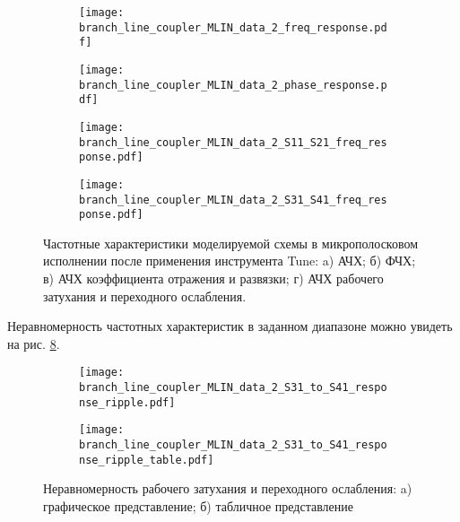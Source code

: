 \begin{figure}[!ht]
    \centering
    \begin{subfigure}[b]{0.45\textwidth}
        \centering
        \texttt{[image: branch\_line\_coupler\_MLIN\_data\_2\_freq\_response.pdf]}
        \caption{}
        \label{fig:branch_line_coupler_MLIN_data_2_freq_response}
    \end{subfigure}
    \hfill
    \begin{subfigure}[b]{0.45\textwidth}
        \centering
        \texttt{[image: branch\_line\_coupler\_MLIN\_data\_2\_phase\_response.pdf]}
        \caption{}
        \label{fig:branch_line_coupler_MLIN_data_2_phase_response}
    \end{subfigure}
    \vfill
    \begin{subfigure}[b]{0.45\textwidth}
        \centering
        \texttt{[image: branch\_line\_coupler\_MLIN\_data\_2\_S11\_S21\_freq\_response.pdf]}
        \caption{}
        \label{fig:branch_line_coupler_MLIN_data_2_S11_S21_freq_response}
    \end{subfigure}
    \hfill
    \begin{subfigure}[b]{0.45\textwidth}
        \centering
        \texttt{[image: branch\_line\_coupler\_MLIN\_data\_2\_S31\_S41\_freq\_response.pdf]}
        \caption{}
        \label{fig:branch_line_coupler_MLIN_data_2_S31_S41_freq_response}
    \end{subfigure}
    \caption{
        Частотные характеристики моделируемой схемы в микрополосковом исполнении после применения инструмента Tune:
        a) АЧХ;
        б) ФЧХ;
        в) АЧХ коэффициента отражения и развязки;
        г) АЧХ рабочего затухания и переходного ослабления.
    }
    \label{fig:branch_line_coupler_MLIN_data_2}
\end{figure}

Неравномерность частотных характеристик в заданном диапазоне можно увидеть на рис. \ref{fig:branch_line_coupler_MLIN_data_2_response_ripple}.

\begin{figure}[!ht]
    \centering
    \begin{subfigure}[b]{0.6\textwidth}
        \centering
        \texttt{[image: branch\_line\_coupler\_MLIN\_data\_2\_S31\_to\_S41\_response\_ripple.pdf]}
        \caption{}
        \label{fig:branch_line_coupler_MLIN_data_2_S31_to_S41_response_ripple}
    \end{subfigure}
    \vfill
    \begin{subfigure}[b]{0.6\textwidth}
        \centering
        \texttt{[image: branch\_line\_coupler\_MLIN\_data\_2\_S31\_to\_S41\_response\_ripple\_table.pdf]}
        \caption{}
        \label{fig:branch_line_coupler_MLIN_data_2_S31_to_S41_response_ripple_table}
    \end{subfigure}
    \caption{
        Неравномерность рабочего затухания и переходного ослабления:
        a) графическое представление;
        б) табличное представление
    }
    \label{fig:branch_line_coupler_MLIN_data_2_response_ripple}
\end{figure}

